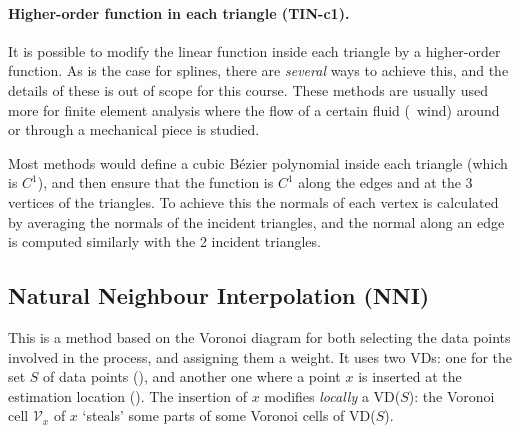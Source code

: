 \paragraph{Higher-order function in each triangle (\textbf{TIN-c1}).}
It is possible to modify the linear function inside each triangle by a higher-order function.
As is the case for splines, there are \emph{several} ways to achieve this, and the details of these is out of scope for this course.
These methods are usually used more for finite element analysis where the flow of a certain fluid (\eg\ wind) around or through a mechanical piece is studied.

%

Most methods would define a cubic Bézier polynomial inside each triangle (which is $C^1$), and then ensure that the function is $C^1$ along the edges and at the 3 vertices of the triangles.
To achieve this the normals of each vertex is calculated by averaging the normals of the incident triangles, and the normal along an edge is computed similarly with the 2 incident triangles.



\subsection{Natural Neighbour Interpolation (\textbf{NNI})}

This is a method based on the Voronoi diagram for both selecting the data points involved in the process, and assigning them a weight.  
It uses two VDs: one for the set $S$ of data points (), and another one where a point $x$ is inserted at the estimation location (). 
The insertion of $x$ modifies \emph{locally} a VD($S$): the Voronoi cell $\mathcal{V}_{x}$ of $x$ `steals' some parts of some Voronoi cells of VD($S$).

